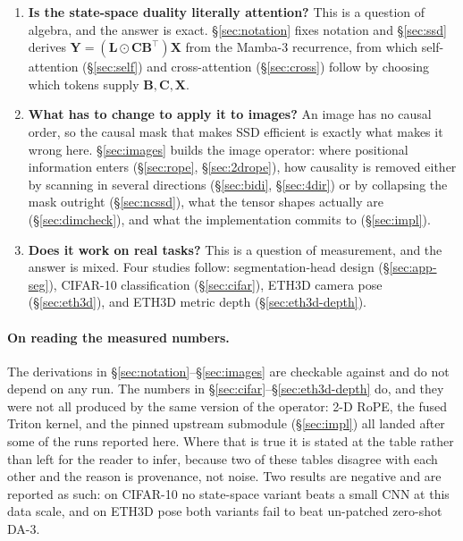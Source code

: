 \documentclass[11pt,a4paper]{article}
\begin{document}
\begin{enumerate}
  \item \textbf{Is the state-space duality literally attention?} This is a question
        of algebra, and the answer is exact. \S\ref{sec:notation} fixes notation and
        \S\ref{sec:ssd} derives
        $\bm{Y}=(\bm{L}\odot\bm{C}\bm{B}^\top)\bm{X}$ from the Mamba-3 recurrence,
        from which self-attention (\S\ref{sec:self}) and cross-attention
        (\S\ref{sec:cross}) follow by choosing which tokens supply
        $\bm{B},\bm{C},\bm{X}$.
  \item \textbf{What has to change to apply it to images?} An image has no causal
        order, so the causal mask that makes SSD efficient is exactly what makes it
        wrong here. \S\ref{sec:images} builds the image operator: where positional
        information enters (\S\ref{sec:rope}, \S\ref{sec:2drope}), how causality is
        removed either by scanning in several directions (\S\ref{sec:bidi},
        \S\ref{sec:4dir}) or by collapsing the mask outright (\S\ref{sec:ncssd}),
        what the tensor shapes actually are (\S\ref{sec:dimcheck}), and what the
        implementation commits to (\S\ref{sec:impl}).
  \item \textbf{Does it work on real tasks?} This is a question of measurement, and
        the answer is mixed. Four studies follow: segmentation-head design
        (\S\ref{sec:app-seg}), CIFAR-10 classification (\S\ref{sec:cifar}), ETH3D
        camera pose (\S\ref{sec:eth3d}), and ETH3D metric depth
        (\S\ref{sec:eth3d-depth}).
\end{enumerate}

\paragraph{On reading the measured numbers.} The derivations in
\S\ref{sec:notation}--\S\ref{sec:images} are checkable against \cite{mamba3} and do
not depend on any run. The numbers in \S\ref{sec:cifar}--\S\ref{sec:eth3d-depth} do,
and they were not all produced by the same version of the operator: 2-D RoPE, the
fused Triton kernel, and the pinned upstream submodule (\S\ref{sec:impl}) all landed
after some of the runs reported here. Where that is true it is stated at the table
rather than left for the reader to infer, because two of these tables disagree with
each other and the reason is provenance, not noise. Two results are negative and are
reported as such: on CIFAR-10 no state-space variant beats a small CNN at this data
scale, and on ETH3D pose both variants fail to beat un-patched zero-shot DA-3.
\end{document}
